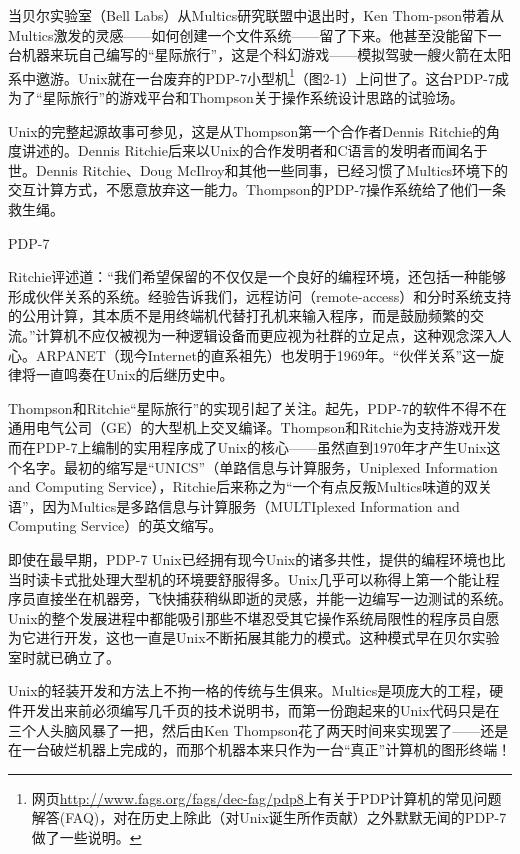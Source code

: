 \documentclass[12pt,oneside]{book}
\begin{document}
\begin{common-format}
当贝尔实验室（Bell Labs）从Multics研究联盟中退出时，Ken Thom-pson带着从Multics激发的灵感——如何创建一个文件系统——留了下来。他甚至没能留下一台机器来玩自己编写的“星际旅行”，这是个科幻游戏——模拟驾驶一艘火箭在太阳系中邀游。Unix就在一台废弃的PDP-7小型机\footnote{网页\href{http://www.fags.org/fags/dec-fag/pdp8}{http://www.fags.org/fags/dec-fag/pdp8}上有关于PDP计算机的常见问题解答(FAQ)，对在历史上除此（对Unix诞生所作贡献）之外默默无闻的PDP-7做了一些说明。}（图2-1）上问世了。这台PDP-7成为了“星际旅行”的游戏平台和Thompson关于操作系统设计思路的试验场。

Unix的完整起源故事可参见\cite{Ritchie79}，这是从Thompson第一个合作者Dennis Ritchie的角度讲述的。Dennis Ritchie后来以Unix的合作发明者和C语言的发明者而闻名于世。Dennis Ritchie、Doug McIlroy和其他一些同事，已经习惯了Multics环境下的交互计算方式，不愿意放弃这一能力。Thompson的PDP-7操作系统给了他们一条救生绳。

\begin{fig}[2]{PDP-7}
\label{fig:PDP-7}
\end{fig}

Ritchie评述道：“我们希望保留的不仅仅是一个良好的编程环境，还包括一种能够形成伙伴关系的系统。经验告诉我们，远程访问（remote-access）和分时系统支持的公用计算，其本质不是用终端机代替打孔机来输入程序，而是鼓励频繁的交流。”计算机不应仅被视为一种逻辑设备而更应视为社群的立足点，这种观念深入人心。ARPANET（现今Internet的直系祖先）也发明于1969年。“伙伴关系”这一旋律将一直鸣奏在Unix的后继历史中。

Thompson和Ritchie“星际旅行”的实现引起了关注。起先，PDP-7的软件不得不在通用电气公司（GE）的大型机上交叉编译。Thompson和Ritchie为支持游戏开发而在PDP-7上编制的实用程序成了Unix的核心——虽然直到1970年才产生Unix这个名字。最初的缩写是“UNICS”（单路信息与计算服务，Uniplexed Information and Computing Service），Ritchie后来称之为“一个有点反叛Multics味道的双关语”，因为Multics是多路信息与计算服务（MULTIplexed Information and Computing Service）的英文缩写。

即使在最早期，PDP-7 Unix已经拥有现今Unix的诸多共性，提供的编程环境也比当时读卡式批处理大型机的环境要舒服得多。Unix几乎可以称得上第一个能让程序员直接坐在机器旁，飞快捕获稍纵即逝的灵感，并能一边编写一边测试的系统。Unix的整个发展进程中都能吸引那些不堪忍受其它操作系统局限性的程序员自愿为它进行开发，这也一直是Unix不断拓展其能力的模式。这种模式早在贝尔实验室时就已确立了。

Unix的轻装开发和方法上不拘一格的传统与生俱来。Multics是项庞大的工程，硬件开发出来前必须编写几千页的技术说明书，而第一份跑起来的Unix代码只是在三个人头脑风暴了一把，然后由Ken Thompson花了两天时间来实现罢了——还是在一台破烂机器上完成的，而那个机器本来只作为一台“真正”计算机的图形终端！


\end{common-format}
\end{document}
